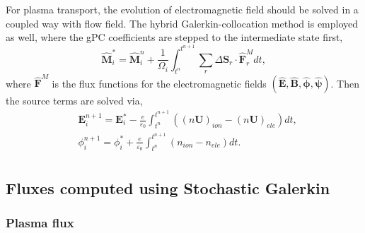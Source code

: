 \documentclass[preprint,3p,12pt,sort&compress]{elsarticle}
\begin{document}
For plasma transport, the evolution of electromagnetic field should be solved in a coupled way with flow field.
The hybrid Galerkin-collocation method is employed as well, where the gPC coefficients are stepped to the intermediate state first,
\begin{equation}
\hat{\boldsymbol{M}}_{i}^{*}=\hat{\boldsymbol{M}}_{i}^{n}+\frac{1}{\Omega_{i}} \int_{t^{n}}^{t^{n+1}} \sum_{r} \Delta \mathbf{S}_{r} \cdot \hat{\boldsymbol{F}}_{r}^{M} d t,
\label{eqn:galerkin em update}
\end{equation}
where $\hat{\boldsymbol{F}}^M$ is the flux functions for the electromagnetic fields $(\hat{\boldsymbol E}, \hat{\boldsymbol B}, \hat{\boldsymbol \phi}, \hat{\boldsymbol \psi})$.
Then the source terms are solved via,
\begin{equation}
\begin{aligned}
	&{\mathbf{E}}_{i}^{n+1}={\mathbf{E}}_{i}^{*}
	-\frac{e}{\varepsilon_0} \int_{t^n}^{t^{n+1}} \left( {( n \mathbf U)}_{ion} - {( n \mathbf U)}_{ele} \right) dt, \\
	&{{\phi}}_{i}^{n+1}={{\phi}}_{i}^{*}
	+\frac{e}{\varepsilon_0} \int_{t^n}^{t^{n+1}} \left(n_{ion}-n_{ele} \right) dt. \\
\end{aligned}
\end{equation}

\subsection{Fluxes computed using Stochastic Galerkin}\label{sec:sg treatment}

\subsubsection{Plasma flux}
\end{document}
